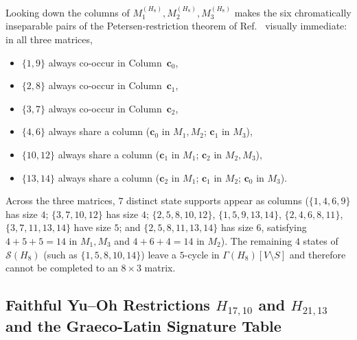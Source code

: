 \documentclass[aps,pra,reprint,superscriptaddress,longbibliography,nofootinbib,floatfix,10pt]{revtex4-2}
\theoremstyle{definition}\newtheorem{definition}[theorem]{Definition}
\theoremstyle{remark}\newtheorem{remark}[theorem]{Remark}
\newcommand{\Sc}{\mathcal S}\newcommand{\Cc}{\mathcal C}
\begin{document}
Looking down the columns of $M_1^{(H_8)},M_2^{(H_8)},M_3^{(H_8)}$ makes the six chromatically inseparable pairs of the Petersen-restriction theorem of Ref.~\cite{svozil2026contexts} visually immediate: in all three matrices,
\begin{itemize}
\item $\{1,9\}$ always co-occur in Column~$\mathbf{c}_0$,
\item $\{2,8\}$ always co-occur in Column~$\mathbf{c}_1$,
\item $\{3,7\}$ always co-occur in Column~$\mathbf{c}_2$,
\item $\{4,6\}$ always share a column ($\mathbf{c}_0$ in $M_1,M_2$; $\mathbf{c}_1$ in $M_3$),
\item $\{10,12\}$ always share a column ($\mathbf{c}_1$ in $M_1$; $\mathbf{c}_2$ in $M_2,M_3$),
\item $\{13,14\}$ always share a column ($\mathbf{c}_2$ in $M_1$; $\mathbf{c}_1$ in $M_2$; $\mathbf{c}_0$ in $M_3$).
\end{itemize}
Across the three matrices, $7$ distinct state supports appear as columns ($\{1,4,6,9\}$ has size $4$; $\{3,7,10,12\}$ has size $4$; $\{2,5,8,10,12\}$, $\{1,5,9,13,14\}$, $\{2,4,6,8,11\}$, $\{3,7,11,13,14\}$ have size $5$; and $\{2,5,8,11,13,14\}$ has size $6$, satisfying $4+5+5=14$ in $M_1,M_3$ and $4+6+4=14$ in $M_2$). The remaining $4$ states of $\Sc(H_8)$ (such as $\{1,5,8,10,14\}$) leave a $5$-cycle in $\Gamma(H_8)[V\setminus S]$ and therefore cannot be completed to an $8\times 3$ matrix.

\subsection{Faithful Yu--Oh Restrictions \texorpdfstring{$H_{17,10}$ and $H_{21,13}$}{H17,10 and H21,13} and the Graeco-Latin Signature Table}\label{sec:H17-H21}
\end{document}
